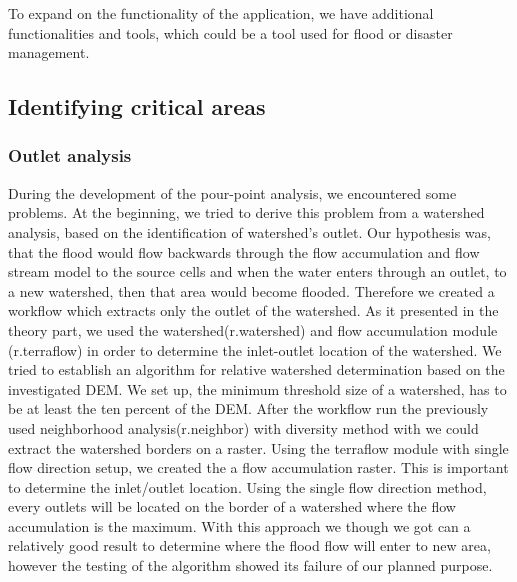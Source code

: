 To expand on the functionality of the application, we have additional functionalities and tools, which could be a tool used for flood or disaster management. 

\subsection{Identifying critical areas}
\subsubsection{Outlet analysis}
During the development of the pour-point analysis, we encountered some problems. At the beginning, we tried to derive this problem from a watershed analysis, based on the identification of watershed's outlet. Our hypothesis was, that the flood  would flow backwards through the flow accumulation and flow stream model to the source cells and when the water enters through an outlet, to a new watershed, then that area would become flooded. Therefore we created a workflow which extracts only the outlet of the watershed. As it presented in the theory part, we used the watershed(r.watershed) and flow accumulation module (r.terraflow) in order to determine the inlet-outlet location of the watershed. We tried to establish an algorithm for relative watershed determination based on the investigated DEM. We set up, the minimum threshold size of a watershed, has to be at least the ten percent of the DEM. After the workflow run the previously used neighborhood analysis(r.neighbor) with diversity method with we could extract the watershed borders on a raster. Using the terraflow module with single flow direction setup, we created the a flow accumulation raster. This is important to determine the inlet/outlet location. Using the single flow direction method, every outlets will be located on the border of a watershed where the flow accumulation is the maximum. With this approach we though we got can a relatively good result to determine where the flood flow will enter to new area, however the testing of the algorithm showed its failure of our planned purpose.

